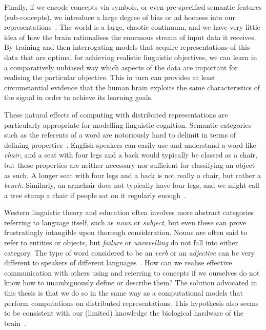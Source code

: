 \documentclass[11pt,letterpaper]{article}
\begin{document}
Finally, if we encode concepts via symbols, or even pre-specified semantic features (sub-concepts), we introduce a large degree of bias or ad hocness into our representations~\citep{miikkulainen1991natural}. The world is a large, chaotic continuum, and we have very little idea of how the brain rationalises the enormous stream of input data it receives. By training and then interrogating models that acquire representations of this data that are optimal for achieving realistic linguistic objectives, we can learn in a comparatively unbiased way which aspects of the data are important for realising the particular objective. This in turn can provides at least circumstantial evidence that the human brain exploits the same characteristics of the signal in order to achieve its learning goals.     

These natural effects of computing with distributed representations are particularly appropriate for modelling linguistic cognition. Semantic categories such as the referents of a word are notoriously hard to delimit in terms of defining properties~\citep{fauconnier1994mental}. English speakers can easily use and understand a word like \emph{chair}, and a seat with four legs and a back would typically be classed as a chair, but these properties are neither necessary nor sufficient for classifying an object as such. A longer seat with four legs and a back is not really a chair, but rather a \emph{bench}. Similarly, an armchair does not typically have four legs, and we might call a tree stump a chair if people sat on it regularly enough~\citep{prinz2004furnishing}. 

Western linguistic theory and education often involves more abstract categories referring to language itself, such as \emph{noun} or \emph{subject}, but even these can prove frustratingly intangible upon thorough consideration. Nouns are often said to refer to entities or objects, but \emph{failure} or \emph{unravelling} do not fall into either category. The type of word considered to be an \emph{verb} or an \emph{adjective} can be very different to speakers of different languages~\citep{anward1997parts}. How can we realise effective communication with others using and referring to concepts if we ourselves do not know how to unambiguously define or describe them? The solution advocated in this thesis is that we do so in the same way as a computational models that perform computations on distributed representations. This hypothesis also seems to be consistent with our (limited) knowledge the biological hardware of the brain~\citep{kiefer2012conceptual}.
 
\end{document}
